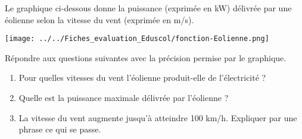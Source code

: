 
Le graphique ci-dessous donne la puissance (exprimée en kW) délivrée par une éolienne selon la
vitesse du vent (exprimée en m/s).

\texttt{[image: ../../Fiches\_evaluation\_Eduscol/fonction-Eolienne.png]} 

Répondre aux questions suivantes avec la précision permise par le graphique.
\begin{enumerate}
\item Pour quelles vitesses du vent l’éolienne produit-elle de l’électricité ?
\item  Quelle est la puissance maximale délivrée par l’éolienne ?
\item  La vitesse du vent augmente jusqu’à atteindre 100 km/h. Expliquer par une phrase ce qui se
passe.
\end{enumerate}